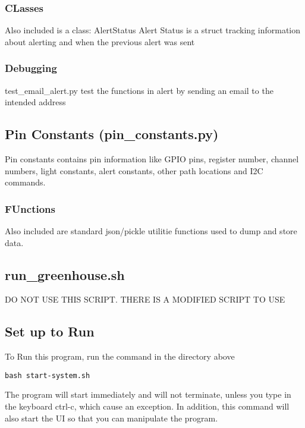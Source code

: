 \documentclass[
]{article}
\begin{document}
\hypertarget{classes-1}{%
\subsubsection{CLasses}\label{classes-1}}

Also included is a class: AlertStatus Alert Status is a struct tracking
information about alerting and when the previous alert was sent

\hypertarget{debugging-2}{%
\subsubsection{Debugging}\label{debugging-2}}

test\_email\_alert.py test the functions in alert by sending an email to
the intended address

\hypertarget{pin-constants-pin_constants.py}{%
\subsection{Pin Constants
(pin\_constants.py)}\label{pin-constants-pin_constants.py}}

Pin constants contains pin information like GPIO pins, register number,
channel numbers, light constants, alert constants, other path locations
and I2C commands.

\hypertarget{functions-2}{%
\subsubsection{FUnctions}\label{functions-2}}

Also included are standard json/pickle utilitie functions used to dump
and store data.

\hypertarget{run_greenhouse.sh}{%
\subsection{run\_greenhouse.sh}\label{run_greenhouse.sh}}

DO NOT USE THIS SCRIPT. THERE IS A MODIFIED SCRIPT TO USE

\hypertarget{set-up-to-run}{%
\subsection{Set up to Run}\label{set-up-to-run}}

To Run this program, run the command in the directory above

\begin{verbatim}
bash start-system.sh
\end{verbatim}

The program will start immediately and will not terminate, unless you
type in the keyboard ctrl-c, which cause an exception. In addition, this
command will also start the UI so that you can manipulate the program.
\end{document}
